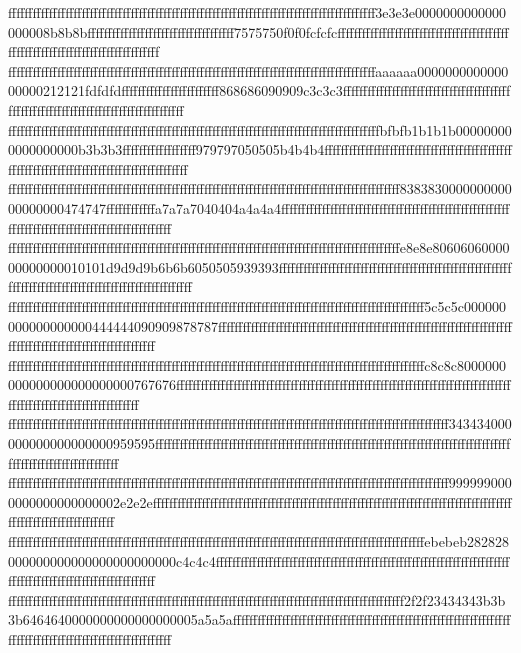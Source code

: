 {{{ffffffffffffffffffffffffffffffffffffffffffffffffffffffffffffffffffffffffffffffffffffffffff3e3e3e0000000000000000008b8b8bffffffffffffffffffffffffffffffffffff7575750f0f0fcfcfcfffffffffffffffffffffffffffffffffffffffffffffffffffffffffffffffffffffffffffffff
ffffffffffffffffffffffffffffffffffffffffffffffffffffffffffffffffffffffffffffffffffffffffffaaaaaa000000000000000000212121fdfdfdffffffffffffffffffffffff868686090909c3c3c3ffffffffffffffffffffffffffffffffffffffffffffffffffffffffffffffffffffffffffffffffffff
fffffffffffffffffffffffffffffffffffffffffffffffffffffffffffffffffffffffffffffffffffffffffffbfbfb1b1b1b000000000000000000b3b3b3ffffffffffffffffff979797050505b4b4b4ffffffffffffffffffffffffffffffffffffffffffffffffffffffffffffffffffffffffffffffffffffffffff
ffffffffffffffffffffffffffffffffffffffffffffffffffffffffffffffffffffffffffffffffffffffffffffffff838383000000000000000000474747ffffffffffffa7a7a7040404a4a4a4ffffffffffffffffffffffffffffffffffffffffffffffffffffffffffffffffffffffffffffffffffffffffffffffff
ffffffffffffffffffffffffffffffffffffffffffffffffffffffffffffffffffffffffffffffffffffffffffffffffe8e8e8060606000000000000010101d9d9d9b6b6b6050505939393ffffffffffffffffffffffffffffffffffffffffffffffffffffffffffffffffffffffffffffffffffffffffffffffffffffff
ffffffffffffffffffffffffffffffffffffffffffffffffffffffffffffffffffffffffffffffffffffffffffffffffffffff5c5c5c000000000000000000444444090909878787ffffffffffffffffffffffffffffffffffffffffffffffffffffffffffffffffffffffffffffffffffffffffffffffffffffffffffff
ffffffffffffffffffffffffffffffffffffffffffffffffffffffffffffffffffffffffffffffffffffffffffffffffffffffc8c8c8000000000000000000000000767676ffffffffffffffffffffffffffffffffffffffffffffffffffffffffffffffffffffffffffffffffffffffffffffffffffffffffffffffffff
ffffffffffffffffffffffffffffffffffffffffffffffffffffffffffffffffffffffffffffffffffffffffffffffffffffffffffff343434000000000000000000959595ffffffffffffffffffffffffffffffffffffffffffffffffffffffffffffffffffffffffffffffffffffffffffffffffffffffffffffffffff
ffffffffffffffffffffffffffffffffffffffffffffffffffffffffffffffffffffffffffffffffffffffffffffffffffffffffffff9999990000000000000000002e2e2effffffffffffffffffffffffffffffffffffffffffffffffffffffffffffffffffffffffffffffffffffffffffffffffffffffffffffffffff
ffffffffffffffffffffffffffffffffffffffffffffffffffffffffffffffffffffffffffffffffffffffffffffffffffffffebebeb282828000000000000000000000000c4c4c4ffffffffffffffffffffffffffffffffffffffffffffffffffffffffffffffffffffffffffffffffffffffffffffffffffffffffffff
fffffffffffffffffffffffffffffffffffffffffffffffffffffffffffffffffffffffffffffffffffffffffffffffff2f2f23434343b3b3b6464640000000000000000005a5a5affffffffffffffffffffffffffffffffffffffffffffffffffffffffffffffffffffffffffffffffffffffffffffffffffffffffffff
}}}
